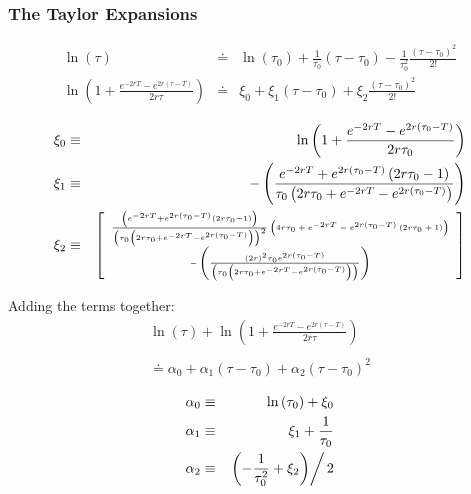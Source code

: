 \documentclass[12pt,compress,handout]{beamer}  %
\begin{document}
\begin{frame}
\frametitle{The Taylor Expansions}
\begin{eqnarray*}
\ln \left( \tau \right) &\doteq &\ln \left( \tau _{0}\right)
+\frac{1}{\tau _{0}}\left( \tau -\tau _{0}\right) -\frac{1}{\tau
_{0}^{2}}\frac{\left( \tau
-\tau _{0}\right) ^{2}}{2!} \\
\ln \left( 1+\frac{e^{-2rT}-e^{2r(\tau -T)}}{2r\tau }\right) &\doteq
&\xi _{0}+\xi _{1}\left( \tau -\tau _{0}\right) +\xi
_{2}\frac{\left( \tau -\tau _{0}\right) ^{2}}{2!}
\end{eqnarray*}

\begin{eqnarray*}
\xi _{0} &\equiv &\ln \left( 1+\frac{e^{-2rT}-e^{2r(\tau
_{0}-T)}}{2r\tau
_{0}}\right) \\
\xi _{1} &\equiv &-\left( \frac{e^{-2rT}+e^{2r(\tau _{0}-T)}\left(
2r\tau _{0}-1\right) }{\tau _{0}\left( 2r\tau
_{0}+e^{-2rT}-e^{2r(\tau
_{0}-T)}\right) }\right) \\
\xi _{2} &\equiv & {\tiny \left[
\begin{array}{c}
\frac{\left( e^{-2rT}+e^{2r(\tau _{0}-T)}\left( 2r\tau _{0}-1\right)
\right) }{\left( \tau _{0}\left( 2r\tau _{0}+e^{-2rT}-e^{2r(\tau
_{0}-T)}\right) \right) ^{2}}\left( 4r\tau _{0}+e^{-2rT}-e^{2r(\tau
_{0}-T)}\left( 2r\tau
_{0}+1\right) \right) \\
-\left( \frac{\left( 2r\right) ^{2}\tau _{0}e^{2r(\tau
_{0}-T)}}{\left( \tau _{0}\left( 2r\tau _{0}+e^{-2rT}-e^{2r(\tau
_{0}-T)}\right) \right) }\right)
\end{array}
\right]}
\end{eqnarray*}
\end{frame}


\begin{frame}
Adding the terms together:
\begin{multline*}
    \ln \left( \tau \right) +\ln \left( 1+\frac{e^{-2rT}-e^{2r(\tau
-T)}}{2r\tau }\right) \\
\\
\doteq \alpha _{0}+\alpha _{1}\left( \tau -\tau _{0}\right) +\alpha
_{2}\left( \tau -\tau _{0}\right) ^{2}
\end{multline*}

\begin{eqnarray*}
\alpha _{0} &\equiv &\ln \left( \tau _{0}\right) +\xi _{0} \\
\alpha _{1} &\equiv &\xi _{1}+\frac{1}{\tau _{0}} \\
\alpha _{2} &\equiv &\left. \left( -\frac{1}{\tau _{0}^{2}}+\xi
_{2}\right) \right/ 2
\end{eqnarray*}
\end{frame}
\end{document}
